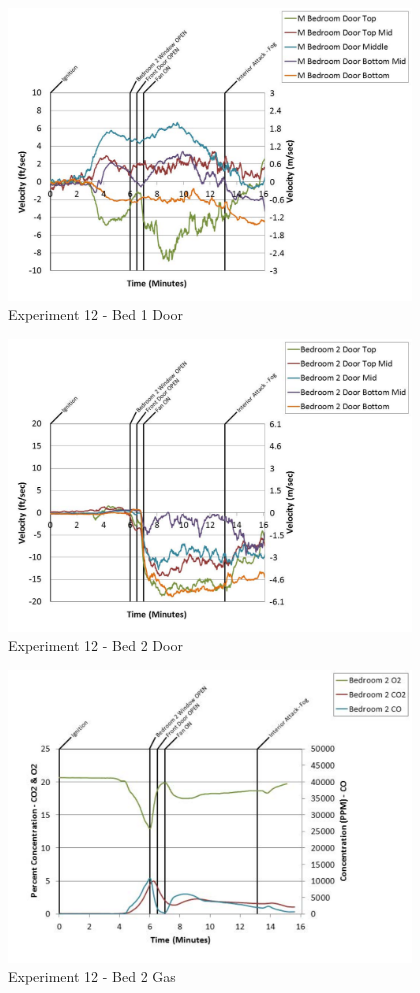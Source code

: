 \documentclass{article}
\begin{document}
\begin{appendices}
	\clearpage

	\begin{figure}[h!]
		\centering
		\includegraphics[height=3.05in]{0_Images/Results_Charts/Exp_12_Charts/Bed1Door.pdf}
		\caption{Experiment 12 - Bed 1 Door}
	\end{figure}
 

	\begin{figure}[h!]
		\centering
		\includegraphics[height=3.05in]{0_Images/Results_Charts/Exp_12_Charts/Bed2Door.pdf}
		\caption{Experiment 12 - Bed 2 Door}
	\end{figure}
 
	\clearpage

	\begin{figure}[h!]
		\centering
		\includegraphics[height=3.05in]{0_Images/Results_Charts/Exp_12_Charts/Bed2Gas.pdf}
		\caption{Experiment 12 - Bed 2 Gas}
	\end{figure}
 


\end{appendices}
\end{document}
